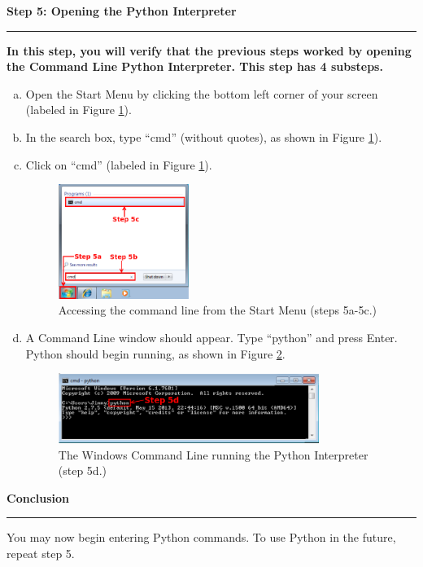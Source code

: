 \documentclass[11pt,english]{article}
\newcommand{\myhrule}{\vspace{0.3cm}\hrule\vspace{0.3cm}}
\begin{document}
\newpage
{\Large {\bf Step 5: Opening the Python Interpreter}}
\myhrule
{\bf In this step, you will verify that the previous steps worked by opening
the Command Line Python Interpreter. This step has 4 substeps.}\\

\begin{enumerate}[a.]
\item Open the Start Menu by clicking the bottom left corner of your screen
(labeled in Figure \ref{fig:dia9}).
\item In the search box, type ``cmd'' (without quotes), as shown in Figure
\ref{fig:dia9}).
\item Click on ``cmd'' (labeled in Figure \ref{fig:dia9}).
\begin{figure}[h]
\begin{center}
\includegraphics[width=0.4\textwidth]{dia9}
\end{center}
\vspace{-0.5cm}
\caption{Accessing the command line from the Start Menu (steps 5a-5c.)}
\label{fig:dia9}
\end{figure}
\item A Command Line window should appear. Type ``python'' and press Enter.
Python should begin running, as shown in Figure \ref{fig:dia10}.
\begin{figure}[h]
\begin{center}
\includegraphics[width=0.8\textwidth]{dia10}
\end{center}
\vspace{-0.5cm}
\caption{The Windows Command Line running the Python Interpreter (step 5d.)}
\label{fig:dia10}
\end{figure}
\end{enumerate}
{\Large {\bf Conclusion}}
\myhrule
You may now begin entering Python commands. To use Python in the future, repeat
step 5.
\end{document}
